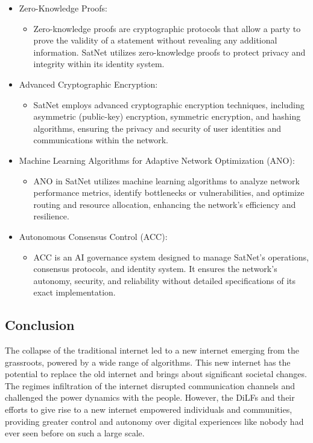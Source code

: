 \documentclass{article}
\theoremstyle{theorem}
\theoremstyle{definition}
\theoremstyle{remark}
\begin{document}
\begin{itemize}
\item Zero-Knowledge Proofs:
\begin{itemize}
\item Zero-knowledge proofs are cryptographic protocols that allow a party to prove the validity of a statement without revealing any additional information. SatNet utilizes zero-knowledge proofs to protect privacy and integrity within its identity system.
\end{itemize}

\item Advanced Cryptographic Encryption:
\begin{itemize}
\item SatNet employs advanced cryptographic encryption techniques, including asymmetric (public-key) encryption, symmetric encryption, and hashing algorithms, ensuring the privacy and security of user identities and communications within the network.
\end{itemize}

\item Machine Learning Algorithms for Adaptive Network Optimization (ANO):
\begin{itemize}
\item ANO in SatNet utilizes machine learning algorithms to analyze network performance metrics, identify bottlenecks or vulnerabilities, and optimize routing and resource allocation, enhancing the network's efficiency and resilience.
\end{itemize}

\item Autonomous Consensus Control (ACC):
\begin{itemize}
\item ACC is an AI governance system designed to manage SatNet's operations, consensus protocols, and identity system. It ensures the network's autonomy, security, and reliability without detailed specifications of its exact implementation.
\end{itemize}
\end{itemize}

\subsection{Conclusion}

The collapse of the traditional internet led to a new internet emerging from the grassroots, powered by a wide range of algorithms. This new internet has the potential to replace the old internet and brings about significant societal changes. The regimes infiltration of the internet disrupted communication channels and challenged the power dynamics with the people. However, the DiLFs and their efforts to give rise to a new internet empowered individuals and communities, providing greater control and autonomy over digital experiences like nobody had ever seen before on such a large scale.
\end{document}
